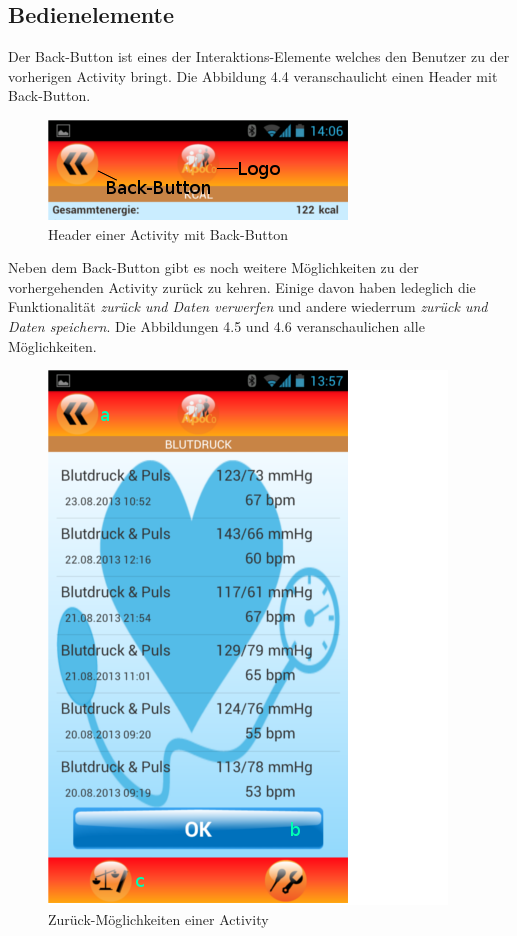 \subsection{Bedienelemente}
Der Back-Button ist eines der Interaktions-Elemente welches den Benutzer zu der vorherigen Activity bringt.
Die Abbildung 4.4 veranschaulicht einen Header mit Back-Button.

\begin{figure}[h]
  \centering
  \includegraphics[scale=0.5]{screenshots/kapitel4/gui/header_backbtn.png}
  \caption{Header einer Activity mit Back-Button}
  
\end{figure}



Neben dem Back-Button gibt es noch weitere M\"oglichkeiten zu der vorhergehenden Activity zur\"uck zu kehren.
Einige davon haben ledeglich die Funktionalit\"at \emph{zur\"uck und Daten verwerfen} und andere wiederrum \emph{zur\"uck und Daten speichern}.
Die Abbildungen 4.5 und 4.6 veranschaulichen alle M\"oglichkeiten.

\begin{figure}[h]
  \centering
  \includegraphics[scale=0.5]{screenshots/kapitel4/gui/back_btns.png}
  \caption{Zur\"uck-M\"oglichkeiten einer Activity}
  
\end{figure}

